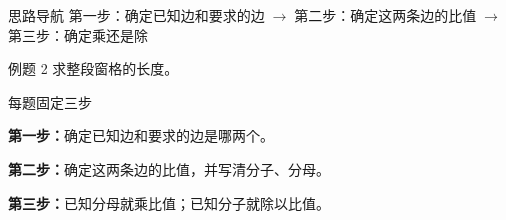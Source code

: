 \documentclass{exam-zh}
\begin{document}
\begin{eduAuxItem}{思路导航}
第一步：确定已知边和要求的边$\;\to\;$第二步：确定这两条边的比值$\;\to\;$第三步：确定乘还是除\end{eduAuxItem}




\begin{eduSubQuestionItem}{例题 2}
求整段窗格的长度。\end{eduSubQuestionItem}

\begin{eduDualExplain}
  \begin{eduExplainLeft}
  \end{eduExplainLeft}

  \begin{eduExplainRight}
  \end{eduExplainRight}
\end{eduDualExplain}




\begin{eduSummaryBlock}{\eduIconPin}{每题固定三步}
\begin{eduBulletList}
  \item \textbf{第一步：}确定已知边和要求的边是哪两个。  \item \textbf{第二步：}确定这两条边的比值，并写清分子、分母。  \item \textbf{第三步：}已知分母就乘比值；已知分子就除以比值。\end{eduBulletList}
\end{eduSummaryBlock}
\end{document}
